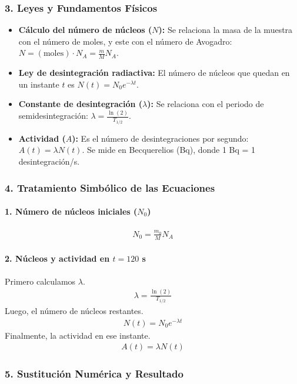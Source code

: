 \subsubsection*{3. Leyes y Fundamentos Físicos}
\begin{itemize}
    \item \textbf{Cálculo del número de núcleos ($N$):} Se relaciona la masa de la muestra con el número de moles, y este con el número de Avogadro: $N = (\text{moles}) \cdot N_A = \frac{m}{M} N_A$.
    \item \textbf{Ley de desintegración radiactiva:} El número de núcleos que quedan en un instante $t$ es $N(t) = N_0 e^{-\lambda t}$.
    \item \textbf{Constante de desintegración ($\lambda$):} Se relaciona con el periodo de semidesintegración: $\lambda = \frac{\ln(2)}{T_{1/2}}$.
    \item \textbf{Actividad ($A$):} Es el número de desintegraciones por segundo: $A(t) = \lambda N(t)$. Se mide en Becquerelios (Bq), donde 1 Bq = 1 desintegración/s.
\end{itemize}

\subsubsection*{4. Tratamiento Simbólico de las Ecuaciones}
\paragraph{1. Número de núcleos iniciales ($N_0$)}
\begin{gather}
    N_0 = \frac{m_0}{M} N_A
\end{gather}
\paragraph{2. Núcleos y actividad en $t=120$ s}
Primero calculamos $\lambda$.
\begin{gather}
    \lambda = \frac{\ln(2)}{T_{1/2}}
\end{gather}
Luego, el número de núcleos restantes.
\begin{gather}
    N(t) = N_0 e^{-\lambda t}
\end{gather}
Finalmente, la actividad en ese instante.
\begin{gather}
    A(t) = \lambda N(t)
\end{gather}

\subsubsection*{5. Sustitución Numérica y Resultado}
